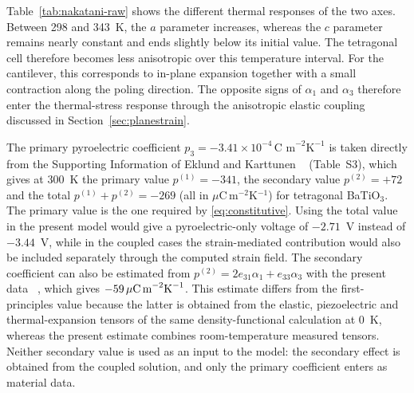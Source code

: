 \documentclass[pdflatex,sn-mathphys-num]{sn-jnl}
\begin{document}
Table~\ref{tab:nakatani-raw} shows the different thermal responses of the two axes.
Between 298 and 343~K, the $a$ parameter increases, whereas the $c$ parameter remains
nearly constant and ends slightly below its initial value. The tetragonal cell
therefore becomes less anisotropic over this temperature interval. For the cantilever,
this corresponds to in-plane expansion together with a small contraction along the
poling direction. The opposite signs of $\alpha_1$ and $\alpha_3$ therefore enter the
thermal-stress response through the anisotropic elastic coupling discussed in
Section~\ref{sec:planestrain}.

The primary pyroelectric coefficient
$p_3=-3.41\times10^{-4}\,\text{C m}^{-2}\text{K}^{-1}$
is taken directly from the Supporting Information of Eklund and Karttunen
~\cite{EklundKarttunen2023} (Table~S3), which gives at 300~K the primary value
$p^{(1)}=-341$, the secondary value $p^{(2)}=+72$ and the total
$p^{(1)}+p^{(2)}=-269$ (all in $\mu$C\,m$^{-2}$K$^{-1}$) for tetragonal BaTiO$_3$.
The primary value is the one required by \eqref{eq:constitutive}. Using the total value
in the present model would give a pyroelectric-only voltage of $-2.71$~V instead of
$-3.44$~V, while in the coupled cases the strain-mediated contribution would also be
included separately through the computed strain field. The secondary coefficient can
also be estimated from
$p^{(2)}=2e_{31}\alpha_1+e_{33}\alpha_3$
with the present data ~\cite{Zgonik1994,Nakatani2016}, which gives
$-59\,\mu\text{C\,m}^{-2}\text{K}^{-1}$. This estimate differs from the
first-principles value because the latter is obtained from the elastic, piezoelectric
and thermal-expansion tensors of the same density-functional calculation at 0~K,
whereas the present estimate combines room-temperature measured tensors. Neither
secondary value is used as an input to the model: the secondary effect is obtained from
the coupled solution, and only the primary coefficient enters as material data.
\end{document}
